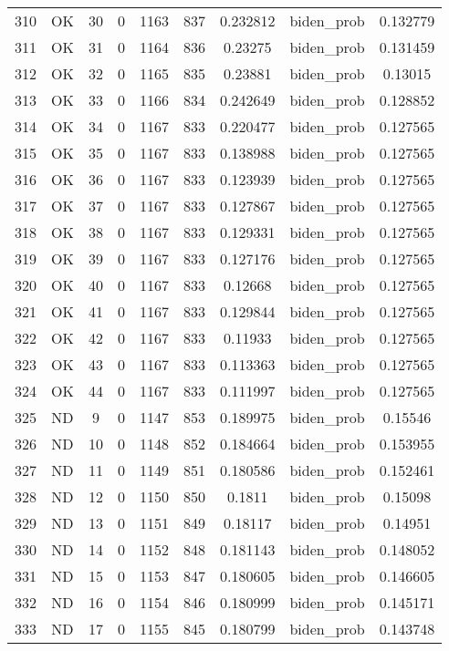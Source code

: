 \documentclass[12pt,a4paper]{article}
\begin{document}
\begin{tabular}{r|cccccccc}
	310 & OK & 30 & 0 & 1163 & 837 & 0.232812 & biden\_prob & 0.132779 \\
	311 & OK & 31 & 0 & 1164 & 836 & 0.23275 & biden\_prob & 0.131459 \\
	312 & OK & 32 & 0 & 1165 & 835 & 0.23881 & biden\_prob & 0.13015 \\
	313 & OK & 33 & 0 & 1166 & 834 & 0.242649 & biden\_prob & 0.128852 \\
	314 & OK & 34 & 0 & 1167 & 833 & 0.220477 & biden\_prob & 0.127565 \\
	315 & OK & 35 & 0 & 1167 & 833 & 0.138988 & biden\_prob & 0.127565 \\
	316 & OK & 36 & 0 & 1167 & 833 & 0.123939 & biden\_prob & 0.127565 \\
	317 & OK & 37 & 0 & 1167 & 833 & 0.127867 & biden\_prob & 0.127565 \\
	318 & OK & 38 & 0 & 1167 & 833 & 0.129331 & biden\_prob & 0.127565 \\
	319 & OK & 39 & 0 & 1167 & 833 & 0.127176 & biden\_prob & 0.127565 \\
	320 & OK & 40 & 0 & 1167 & 833 & 0.12668 & biden\_prob & 0.127565 \\
	321 & OK & 41 & 0 & 1167 & 833 & 0.129844 & biden\_prob & 0.127565 \\
	322 & OK & 42 & 0 & 1167 & 833 & 0.11933 & biden\_prob & 0.127565 \\
	323 & OK & 43 & 0 & 1167 & 833 & 0.113363 & biden\_prob & 0.127565 \\
	324 & OK & 44 & 0 & 1167 & 833 & 0.111997 & biden\_prob & 0.127565 \\
	325 & ND & 9 & 0 & 1147 & 853 & 0.189975 & biden\_prob & 0.15546 \\
	326 & ND & 10 & 0 & 1148 & 852 & 0.184664 & biden\_prob & 0.153955 \\
	327 & ND & 11 & 0 & 1149 & 851 & 0.180586 & biden\_prob & 0.152461 \\
	328 & ND & 12 & 0 & 1150 & 850 & 0.1811 & biden\_prob & 0.15098 \\
	329 & ND & 13 & 0 & 1151 & 849 & 0.18117 & biden\_prob & 0.14951 \\
	330 & ND & 14 & 0 & 1152 & 848 & 0.181143 & biden\_prob & 0.148052 \\
	331 & ND & 15 & 0 & 1153 & 847 & 0.180605 & biden\_prob & 0.146605 \\
	332 & ND & 16 & 0 & 1154 & 846 & 0.180999 & biden\_prob & 0.145171 \\
	333 & ND & 17 & 0 & 1155 & 845 & 0.180799 & biden\_prob & 0.143748 \\

\end{tabular}
\end{document}
